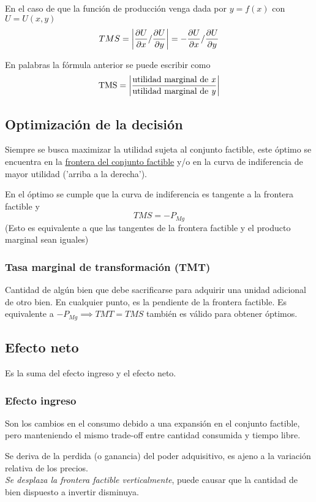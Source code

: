 En el caso de que la función de producción venga dada por $y = f(x)$ con $U = U(x, y)$ \[TMS = \abs{\frac{\partial U}{\partial x} / \frac{\partial U}{\partial y}} = -\frac{\partial U}{\partial x} / \frac{\partial U}{\partial y}\]

En palabras la fórmula anterior se puede escribir como
\[\text{TMS} = \abs{\frac{\text{utilidad marginal de \textit{x}}}{\text{utilidad marginal de \textit{y}}}}\]

\subsection{Optimización de la decisión}
Siempre se busca maximizar la utilidad sujeta al conjunto factible, este óptimo se encuentra en la \hyperlink{frontera-factible}{frontera del conjunto factible} y/o en la curva de indiferencia de mayor utilidad ('arriba a la derecha').

En el óptimo se cumple que la curva de indiferencia es tangente a la frontera factible y \[TMS = -P_{Mg}\] (Esto es equivalente a que las tangentes de la frontera factible y el producto marginal sean iguales)

\subsubsection{Tasa marginal de transformación (TMT)}
Cantidad de algún bien que debe sacrificarse para adquirir una unidad adicional de otro bien. En cualquier punto, es la pendiente de la frontera factible. Es equivalente a $-P_{Mg} \implies TMT = TMS$ también es válido para obtener óptimos.

\subsection{Efecto neto}
Es la suma del efecto ingreso y el efecto neto.

\subsubsection{Efecto ingreso}
Son los cambios en el consumo debido a una expansión en el conjunto factible, pero manteniendo el mismo trade-off entre cantidad consumida y tiempo libre.

Se deriva de la perdida (o ganancia) del poder adquisitivo, es ajeno a la variación relativa de los precios.
\\

\textit{Se desplaza la frontera factible verticalmente}, puede causar que la cantidad de bien dispuesto a invertir disminuya.\\


